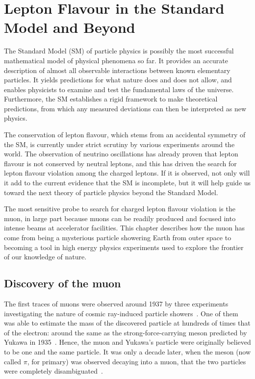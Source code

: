 \chapter{Lepton Flavour in the Standard Model and Beyond}\label{chapter1}

The Standard Model (SM) of particle physics is possibly the most successful
mathematical model of physical phenomena so far. It provides an accurate
description of almost all observable interactions between known elementary
particles. It yields predictions for what nature does and does not allow, and
enables physicists to examine and test the fundamental laws of the universe.
Furthermore, the SM establishes a rigid framework to make theoretical
predictions, from which any measured deviations can then be interpreted as new
physics.

The conservation of lepton flavour, which stems from an accidental symmetry of the SM,
is currently under strict scrutiny by various experiments around the world. 
The observation of neutrino oscillations has already proven that lepton flavour
is not conserved by neutral leptons, and this has driven the search for lepton
flavour violation among the charged leptons. If it is observed, not only will it
add to the current evidence that the SM is incomplete, but it will help guide us
toward the next theory of particle physics beyond the Standard Model.

The most sensitive probe to search for charged lepton flavour violation
is the muon, in large part because muons can be readily produced and focused
into intense beams at accelerator facilities. This chapter describes how the
muon has come from being a mysterious particle showering Earth from outer space
to becoming a tool in high energy physics experiments used to explore the
frontier of our knowledge of nature.


\section{Discovery of the muon}
The first traces of muons were observed around 1937 by three experiments
investigating the nature of cosmic ray-induced particle
showers~\cite{PhysRev.51.884, PhysRev.52.1198, PhysRev.52.1003}. One of them was
able to estimate the mass of the discovered particle at hundreds of times that of the
electron: around the same as the strong-force-carrying meson predicted by Yukawa
in 1935~\cite{10.1143/PTPS.1.1}. Hence, the muon and Yukawa's particle were
originally believed to be one and the same particle. It was only a decade later,
when the meson (now called $\pi$, for primary) was observed decaying into a
muon, that the two particles were completely disambiguated~\cite{LATTES1947}.


